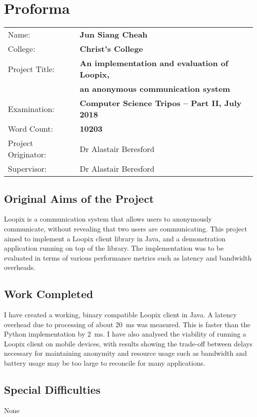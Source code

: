 \documentclass[final,dissertation.tex]{subfiles}
\begin{document}
\pagestyle{plain}

\chapter*{Proforma}

{\large
	\begin{tabular}{ll}
		Name:               & \bf Jun Siang Cheah                               \\
		College:            & \bf Christ's College                              \\
		Project Title:      & \bf An implementation and evaluation of Loopix,   \\ 
		& \bf an anonymous communication system                                 \\
		Examination:        & \bf Computer Science Tripos -- Part II, July 2018 \\
		Word Count:         & \bf 10203\footnotemark                              \\
		Project Originator: & Dr Alastair Beresford                             \\
		Supervisor:         & Dr Alastair Beresford                             \\ 
	\end{tabular}
}


\section*{Original Aims of the Project}


Loopix is a communication system that allows users to anonymously communicate, without revealing that two users are communicating. This project aimed to implement a Loopix client library in Java, and a demonstration application running on top of the library. The implementation was to be evaluated in terms of various performance metrics such as latency and bandwidth overheads.

\section*{Work Completed}


I have created a working, binary compatible Loopix client in Java. A latency overhead due to processing of about \SI{20}{\milli\second} was measured. This is faster than the Python implementation by \SI{2}{\milli\second}. I have also analysed the viability of running a Loopix client on mobile devices, with results showing the trade-off between delays necessary for maintaining anonymity and resource usage such as bandwidth and battery usage may be too large to reconcile for many applications.

\section*{Special Difficulties}

None
\end{document}
